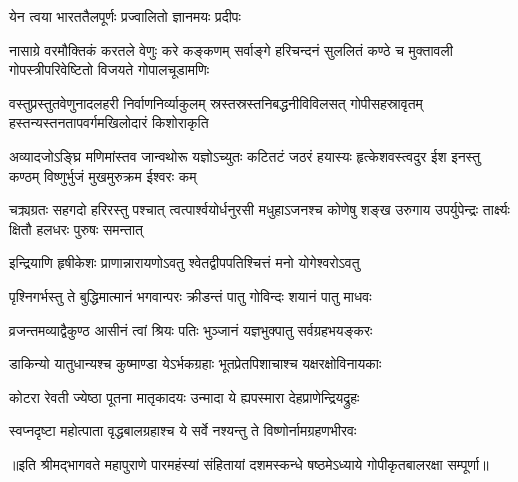 

{येन त्वया भारततैलपूर्णः प्रज्वालितो ज्ञानमयः प्रदीपः}

{नासाग्रे वरमौक्तिकं करतले वेणुः करे कङ्कणम्}
{सर्वाङ्गे हरिचन्दनं सुललितं कण्ठे च मुक्तावली}
{गोपस्त्रीपरिवेष्टितो विजयते गोपालचूडामणिः}

{वस्तुप्रस्तुतवेणुनादलहरी निर्वाणनिर्व्याकुलम्}
{स्रस्तस्रस्तनिबद्धनीविविलसत् गोपीसहस्रावृतम्}
{हस्तन्यस्तनतापवर्गमखिलोदारं किशोराकृति}


\fourlineindentedshloka
{अव्यादजोऽङ्घ्रि मणिमांस्तव जान्वथोरू}
{यज्ञोऽच्युतः कटितटं जठरं हयास्यः}
{हृत्केशवस्त्वदुर ईश इनस्तु कण्ठम्}
{विष्णुर्भुजं मुखमुरुक्रम ईश्वरः कम्}

\fourlineindentedshloka
{चक्र्यग्रतः सहगदो हरिरस्तु पश्चात्}
{त्वत्पार्श्वयोर्धनुरसी मधुहाऽजनश्च}
{कोणेषु शङ्ख उरुगाय उपर्युपेन्द्रः}
{तार्क्ष्यः क्षितौ हलधरः पुरुषः समन्तात्}

\twolineshloka
{इन्द्रियाणि हृषीकेशः प्राणान्नारायणोऽवतु}
{श्वेतद्वीपपतिश्चित्तं मनो योगेश्वरोऽवतु}

\twolineshloka
{पृश्निगर्भस्तु ते बुद्धिमात्मानं भगवान्परः}
{क्रीडन्तं पातु गोविन्दः शयानं पातु माधवः}

\twolineshloka
{व्रजन्तमव्याद्वैकुण्ठ आसीनं त्वां श्रियः पतिः}
{भुञ्जानं यज्ञभुक्पातु सर्वग्रहभयङ्करः}

\twolineshloka
{डाकिन्यो यातुधान्यश्च कुष्माण्डा येऽर्भकग्रहाः}
{भूतप्रेतपिशाचाश्च यक्षरक्षोविनायकाः}

\twolineshloka
{कोटरा रेवती ज्येष्ठा पूतना मातृकादयः}
{उन्मादा ये ह्यपस्मारा देहप्राणेन्द्रियद्रुहः}

\twolineshloka
{स्वप्नदृष्टा महोत्पाता वृद्धबालग्रहाश्च ये}
{सर्वे नश्यन्तु ते विष्णोर्नामग्रहणभीरवः}

{॥इति श्रीमद्भागवते महापुराणे पारमहंस्यां संहितायां दशमस्कन्धे षष्ठमेऽध्याये गोपीकृतबालरक्षा सम्पूर्णा॥}